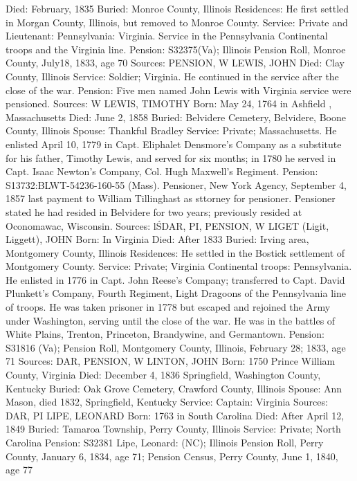 Died: February, 1835 
Buried: Monroe County, Illinois 
Residences: He first settled in Morgan County, Illinois, but removed to Monroe County.
Service: Private and Lieutenant: Pennsylvania: Virginia. Service in the Pennsylvania Continental troops and the Virginia line.
Pension: S32375(Va); Illinois Pension Roll, Monroe County, July18, 1833, age 70
Sources: PENSION, W 
LEWIS, JOHN 
Died: Clay County, Illinois 
Service: Soldier; Virginia. He continued in the service after the close of the war. 
Pension: Five men named John Lewis with Virginia service were pensioned. 
Sources: W 
LEWIS, TIMOTHY 
Born: May 24, 1764 in Ashfield , Massachusetts
Died: June 2, 1858
Buried: Belvidere Cemetery, Belvidere, Boone County, Illinois
Spouse: Thankful Bradley
Service: Private; Massachusetts. He enlisted April 10, 1779 in Capt. Eliphalet Densmore's Company as a substitute for his father, Timothy Lewis, and served for six months; in 1780 he served in Capt. Isaac Newton's Company, Col. Hugh Maxwell's Regiment. 
Pension: S13732:BLWT-54236-160-55 (Mass). Pensioner, New York Agency, September 4, 1857 last payment to William Tillinghast as sttorney for pensioner. Pensioner stated he had resided in Belvidere for two years; previously resided at Oconomawac, Wisconsin. 
Sources: l\'SDAR, PI, PENSION, W 
LIGET (Ligit, Liggett), JOHN 
Born: In Virginia 
Died: After 1833 
Buried: Irving area, Montgomery County, Illinois 
Residences: He settled in the Bostick settlement of Montgomery County. 
Service: Private; Virginia Continental troops: Pennsylvania. He enlisted in 1776 in Capt. John Reese's Company; transferred to Capt. David Plunkett's Company, Fourth Regiment, Light Dragoons of the Pennsylvania line of troops. He was taken prisoner in 1778 but escaped and rejoined the Army under Washington, serving until the close of the war. He was in the battles of White Plains, Trenton, Princeton, Brandywine, and Germantown. 
Pension: S31816 (Va); Pension Roll, Montgomery County, Illinois, February 28; 1833, age 71
Sources: DAR, PENSION, W 
LINTON, JOHN 
Born: 1750 Prince William County, Virginia 
Died: December 4, 1836 Springfield, Washington County, Kentucky 
Buried: Oak Grove Cemetery, Crawford County, Illinois 
Spouse: Ann Mason, died 1832, Springfield, Kentucky
Service: Captain: Virginia
Sources: DAR, PI 
LIPE, LEONARD
Born: 1763 in South Carolina
Died: After April 12, 1849
Buried: Tamaroa Township, Perry County, Illinois
Service: Private; North Carolina
Pension: S32381 Lipe, Leonard: (NC); Illinois Pension Roll, Perry County, Jan­uary 6, 1834, age 71; Pension Census, Perry County, June 1, 1840, age 77
